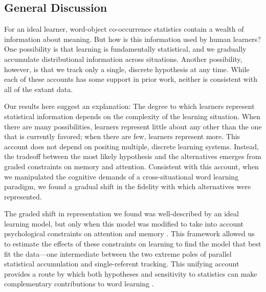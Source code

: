 \documentclass{pnastwo}
\begin{document}
\begin{article}
\section{General Discussion}

For an ideal learner, word-object co-occurrence statistics contain a wealth of information about meaning. But how is this information used by human learners? One possibility is that learning is fundamentally statistical, and we gradually accumulate distributional information across situations. Another possibility, however, is that we track only a single, discrete hypothesis at any time. While each of these accounts has some support in prior work, neither is consistent with all of the extant data.

Our results here suggest an explanation: The degree to which learners represent statistical information depends on the complexity of the learning situation. When there are many possibilities, learners represent little about any other than the one that is currently favored; when there are few, learners represent more. This account does not depend on positing multiple, discrete learning systems. Instead, the tradeoff between the most likely hypothesis and the alternatives emerges from graded constraints on memory and attention. Consistent with this account, when we manipulated the cognitive demands of a cross-situational word learning paradigm, we found a gradual shift in the fidelity with which alternatives were represented.

The graded shift in representation we found was well-described by an ideal learning model, but only when this model was modified to take into account psychological constraints on attention and memory \citep{Kachergis2012,Vlach2013,Yurovsky2014}. This framework allowed us to estimate the effects of these constraints on learning to find the model that best fit the data---one intermediate between the two extreme poles of parallel statistical accumulation and single-referent tracking. This unifying account provides a route by which both hypotheses and sensitivity to statistics can make complementary contributions to word learning \citep{Waxman2009,Kachergis2013}. 


\end{article}
\end{document}
